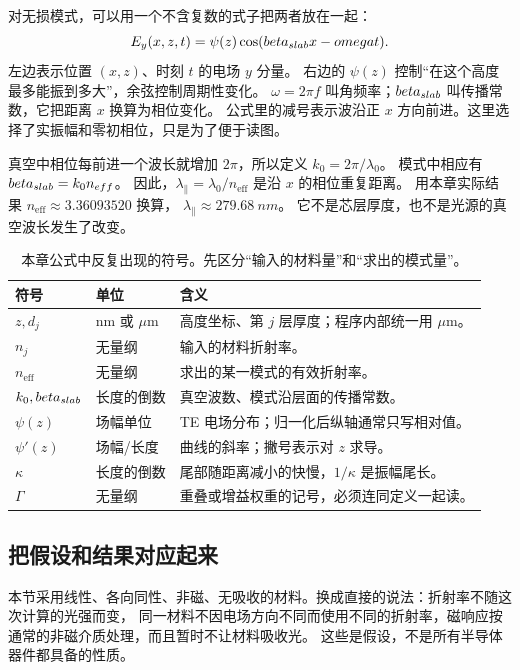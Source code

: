 对无损模式，可以用一个不含复数的式子把两者放在一起：
\[
E_y(x,z,t)=\psi(z)\cos(beta_{slab} x-omega t).
\]
左边表示位置 $(x,z)$、时刻 $t$ 的电场 $y$ 分量。
右边的 $\psi(z)$ 控制“在这个高度最多能振到多大”，余弦控制周期性变化。
$\omega=2\pi f$ 叫角频率；$beta_{slab}$ 叫传播常数，它把距离 $x$ 换算为相位变化。
公式里的减号表示波沿正 $x$ 方向前进。这里选择了实振幅和零初相位，只是为了便于读图。

真空中相位每前进一个波长就增加 $2\pi$，所以定义 $k_0=2\pi/\lambda_0$。
模式中相应有 $beta_{slab}=k_0n_{eff}$。
因此，$\lambda_\parallel=\lambda_0/n_{\mathrm{eff}}$ 是沿 $x$ 的相位重复距离。
用本章实际结果 $n_{\mathrm{eff}}\approx3.36093520$ 换算，
$\lambda_\parallel\approx\SI{279.68}{nm}$。
它不是芯层厚度，也不是光源的真空波长发生了改变。

\begin{table}[htbp]
\centering
\caption{本章公式中反复出现的符号。先区分“输入的材料量”和“求出的模式量”。}
\label{tab:vertical-symbol-primer}
\begin{tabularx}{\textwidth}{@{}p{}p{}Y@{}}
\toprule
符号 & 单位 & 含义\\
\midrule
$z,d_j$ & nm 或 $\mu$m & 高度坐标、第 $j$ 层厚度；程序内部统一用 $\mu$m。\\
$n_j$ & 无量纲 & 输入的材料折射率。\\
$n_{\mathrm{eff}}$ & 无量纲 & 求出的某一模式的有效折射率。\\
$k_0,beta_{slab}$ & 长度的倒数 & 真空波数、模式沿层面的传播常数。\\
$\psi(z)$ & 场幅单位 & TE 电场分布；归一化后纵轴通常只写相对值。\\
$\psi'(z)$ & 场幅/长度 & 曲线的斜率；撇号表示对 $z$ 求导。\\
$\kappa$ & 长度的倒数 & 尾部随距离减小的快慢，$1/\kappa$ 是振幅尾长。\\
$\Gamma$ & 无量纲 & 重叠或增益权重的记号，必须连同定义一起读。\\
\bottomrule
\end{tabularx}
\end{table}

\subsection{把假设和结果对应起来}
本节采用线性、各向同性、非磁、无吸收的材料。换成直接的说法：折射率不随这次计算的光强而变，
同一材料不因电场方向不同而使用不同的折射率，磁响应按通常的非磁介质处理，而且暂时不让材料吸收光。
这些是假设，不是所有半导体器件都具备的性质。

